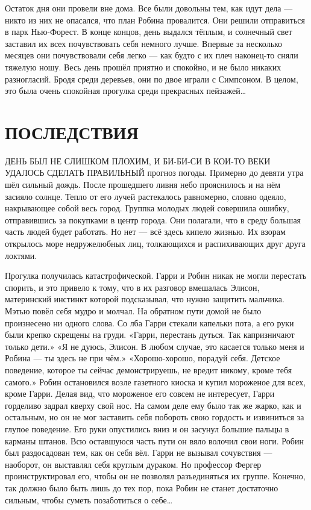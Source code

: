 \documentclass[a4paper,12pt]{book}
\begin{document}
	Остаток дня они провели вне дома. Все были довольны тем, как идут дела — никто из них не опасался, что план Робина провалится.
	 Они решили отправиться в парк Нью-Форест. В конце концов, день выдался тёплым, и солнечный свет заставил их всех почувствовать себя немного лучше.
	Впервые за несколько месяцев они почувствовали себя легко — как будто с их плеч наконец-то сняли тяжелую ношу. Весь день прошёл приятно и спокойно, и не было никаких разногласий.
	Бродя среди деревьев, они по двое играли с Симпсоном.
	В целом, это была очень спокойная прогулка среди прекрасных пейзажей…

\chapter{ПОСЛЕДСТВИЯ}
	ДЕНЬ БЫЛ НЕ СЛИШКОМ ПЛОХИМ, И БИ-БИ-СИ В КОИ-ТО ВЕКИ УДАЛОСЬ СДЕЛАТЬ ПРАВИЛЬНЫЙ прогноз погоды. Примерно до девяти утра шёл сильный дождь. После прошедшего ливня небо прояснилось и на нём засияло солнце. Тепло от его лучей растекалось равномерно, словно одеяло, накрывающее собой весь город.
	Группка молодых людей совершила ошибку, отправившись за покупками в центр города. Они полагали, что в среду большая часть людей будет работать. Но нет — всё здесь кипело жизнью. Их взорам открылось море недружелюбных лиц, толкающихся и распихивающих друг друга локтями.
	
	Прогулка получилась катастрофической. Гарри и Робин никак не могли перестать спорить, и это привело к тому, что в их разговор вмешалась Элисон, материнский инстинкт которой подсказывал, что нужно защитить мальчика. Мэтью повёл себя мудро и молчал. 
	На обратном пути домой не было произнесено ни одного слова. Со лба Гарри стекали капельки пота, а его руки были крепко скрещены на груди.
	«Гарри, перестань дуться. Так капризничают только дети.»
	«Я не дуюсь, Элисон. В любом случае, это касается только меня и Робина — ты здесь не при чём.»
	«Хорошо-хорошо, порадуй себя. Детское поведение, которое ты сейчас демонстрируешь, не вредит никому, кроме тебя самого.»
	 Робин остановился возле газетного киоска и купил мороженое для всех, кроме Гарри. Делая вид, что мороженое его совсем не интересует, Гарри горделиво задрал кверху свой нос. На самом деле ему было так же жарко, как и остальным, но он не мог заставить себя побороть свою гордость и извиниться за глупое поведение. Его руки опустились вниз и он засунул большие пальцы в карманы штанов. Всю оставшуюся часть пути он вяло волочил свои ноги.
	Робин был раздосадован тем, как он себя вёл. Гарри не вызывал сочувствия — наоборот, он выставлял себя круглым дураком. Но профессор Фергер проинструктировал его, чтобы он не позволял разъединяться их группе. Конечно, так должно было быть лишь до тех пор, пока Робин не станет достаточно сильным, чтобы суметь позаботиться о себе…
\end{document}
